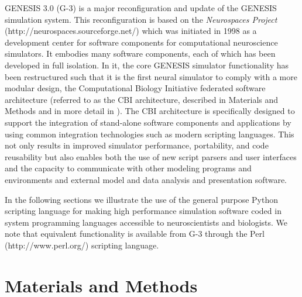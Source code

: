 \documentclass[10pt]{article}
\begin{document}
GENESIS 3.0 (G-3) is a major reconfiguration and update of the GENESIS
simulation system.  This reconfiguration is based on the {\it Neurospaces Project} (http://neurospaces.sourceforge.net/) which was initiated in 1998 as a development center for software components for computational neuroscience simulators. It embodies many software components, each of which has been developed in full isolation. In it, the core GENESIS simulator functionality has been
restructured such that it is the first neural simulator to comply with a more modular design, the Computational 
Biology Initiative federated software architecture (referred to as the CBI
 architecture, described in Materials and Methods and in more detail in \cite{cornelis11b}). The CBI
architecture is specifically designed to support
the integration of stand-alone software components and applications by
using common integration technologies such as modern scripting
languages. This not only results in
improved simulator performance, portability, and code reusability but also enables both the
use of new script parsers and user interfaces and the capacity
to communicate with other modeling programs and environments and external model and data analysis and presentation software.

In the following sections we illustrate the use of the general purpose Python scripting
language for making high performance simulation software coded in
system programming languages accessible to neuroscientists and
biologists. We note that equivalent functionality is available from G-3 through the Perl (http://www.perl.org/) scripting language. 

\section*{Materials and Methods}
\end{document}
